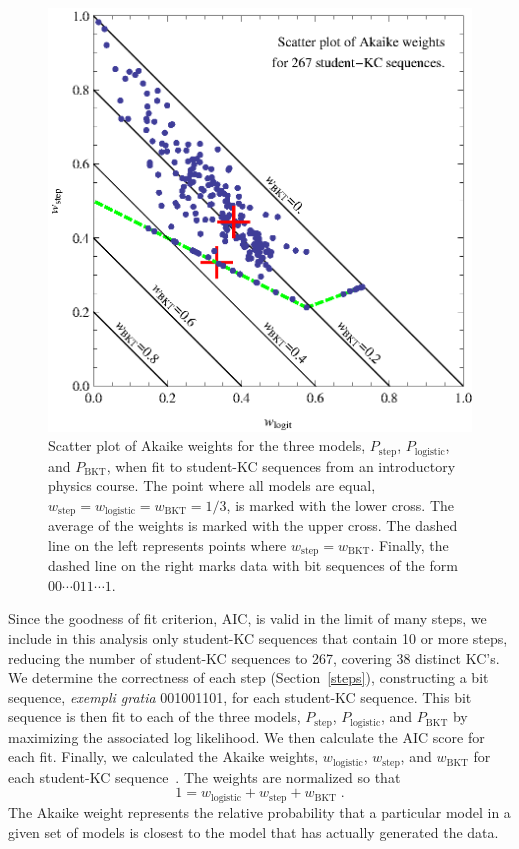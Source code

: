 \documentclass{acmlarge-edm}
\begin{document}
\begin{figure}
  \centering \includegraphics{scatter-weights.eps}
  \caption{Scatter plot of  Akaike weights for the three models, 
   $P_\mathrm{step}$, $P_\mathrm{logistic}$, and $P_\mathrm{BKT}$, 
   when fit to student-KC sequences from an introductory physics course.
   The point where all models are equal,
   $w_\mathrm{step}=w_\mathrm{logistic}=w_\mathrm{BKT}=1/3$, is
   marked with the lower cross.  
   The average of the  weights is marked with
   the upper cross.
  The dashed line on the left represents points
   where $w_\mathrm{step}=w_\mathrm{BKT}$.  Finally, the dashed line on 
   the right marks data with bit sequences of the form
   $00\cdots 011\cdots 1$.} 
   \label{scatter1}
\end{figure}

Since the goodness of fit criterion, AIC, is valid in the limit of
many steps, we include in this analysis only student-KC sequences that
contain 10 or more steps, reducing the number of student-KC sequences to
267, covering 38 distinct KC's.  We determine the correctness of each
step (Section~\ref{steps}), constructing a bit sequence, {\em exempli
gratia} 001001101, for each student-KC sequence.  This bit sequence is then
fit to each of the three models, $P_\mathrm{step}$,
$P_\mathrm{logistic}$, and $P_\mathrm{BKT}$ by maximizing the
associated log likelihood.
We then calculate the AIC score for each fit.  
Finally, we calculated the Akaike weights, $w_\mathrm{logistic}$, $w_\mathrm{step}$, and $w_\mathrm{BKT}$ for each student-KC sequence~\cite{burnham_model_2002}.
The weights are normalized so that
%
\begin{equation}
   1=w_\mathrm{logistic}+ w_\mathrm{step} + w_\mathrm{BKT} \; .
\end{equation}
%
The Akaike weight represents the relative probability that
a particular model in a given set of models is closest
to the model that has actually generated the data. 
\end{document}
